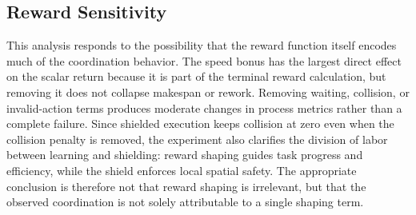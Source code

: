 \documentclass[fleqn,10pt]{wlpeerj}
\begin{document}
\subsection{Reward Sensitivity}

\begin{table}[htbp]
\centering
\caption{Reward-sensitivity analysis. Each variant removes one reward component while keeping the CCT-MARL architecture unchanged. Shielded execution keeps collision at zero, so the main sensitivity appears in scalar return, makespan, waiting, rework, and communication cost.}
\label{tab:reward_sensitivity}
\end{table}

This analysis responds to the possibility that the reward function itself encodes much of the coordination behavior. The speed bonus has the largest direct effect on the scalar return because it is part of the terminal reward calculation, but removing it does not collapse makespan or rework. Removing waiting, collision, or invalid-action terms produces moderate changes in process metrics rather than a complete failure. Since shielded execution keeps collision at zero even when the collision penalty is removed, the experiment also clarifies the division of labor between learning and shielding: reward shaping guides task progress and efficiency, while the shield enforces local spatial safety. The appropriate conclusion is therefore not that reward shaping is irrelevant, but that the observed coordination is not solely attributable to a single shaping term.
\end{document}
